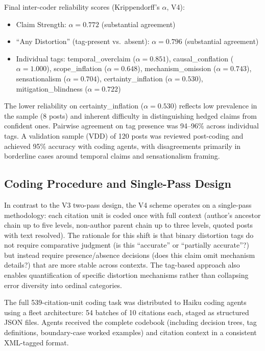 \documentclass[twocolumn,11pt]{article}
\begin{document}
Final inter-coder reliability scores (Krippendorff's $\alpha$, V4):
\begin{itemize}
\item Claim Strength: $\alpha = 0.772$ (substantial agreement)
\item ``Any Distortion'' (tag-present vs.\ absent): $\alpha = 0.796$ (substantial agreement)
\item Individual tags: temporal\_overclaim ($\alpha = 0.851$), causal\_conflation ($\alpha = 1.000$), scope\_inflation ($\alpha = 0.648$), mechanism\_omission ($\alpha = 0.743$), sensationalism ($\alpha = 0.704$), certainty\_inflation ($\alpha = 0.530$), mitigation\_blindness ($\alpha = 0.722$)
\end{itemize}

The lower reliability on certainty\_inflation ($\alpha = 0.530$) reflects low prevalence in the sample (8 posts) and inherent difficulty in distinguishing hedged claims from confident ones. Pairwise agreement on tag presence was 94--96\% across individual tags. A validation sample (VDD) of 120 posts was reviewed post-coding and achieved 95\% accuracy with coding agents, with disagreements primarily in borderline cases around temporal claims and sensationalism framing.

\subsection{Coding Procedure and Single-Pass Design}

In contrast to the V3 two-pass design, the V4 scheme operates on a single-pass methodology: each citation unit is coded once with full context (author's ancestor chain up to five levels, non-author parent chain up to three levels, quoted posts with text resolved). The rationale for this shift is that binary distortion tags do not require comparative judgment (is this ``accurate'' or ``partially accurate''?) but instead require presence/absence decisions (does this claim omit mechanism details?) that are more stable across contexts. The tag-based approach also enables quantification of specific distortion mechanisms rather than collapsing error diversity into ordinal categories.

The full 539-citation-unit coding task was distributed to Haiku coding agents using a fleet architecture: 54 batches of 10 citations each, staged as structured JSON files. Agents received the complete codebook (including decision trees, tag definitions, boundary-case worked examples) and citation context in a consistent XML-tagged format.
\end{document}
